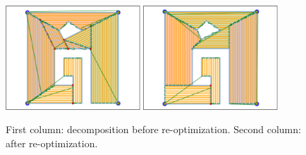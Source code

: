 \documentclass[../main.tex]{subfiles}
\begin{document}
\begin{figure}
		\includegraphics[width=0.45\textwidth]{img/chapter_5/ID_3_orig.pdf}%
		\includegraphics[width=0.45\textwidth]{img/chapter_5/ID_3_reopt.pdf}

	\caption{First column: decomposition before re-optimization. Second column: after re-optimization.}
	\label{fig:decomposition_results}
\end{figure}
\end{document}
